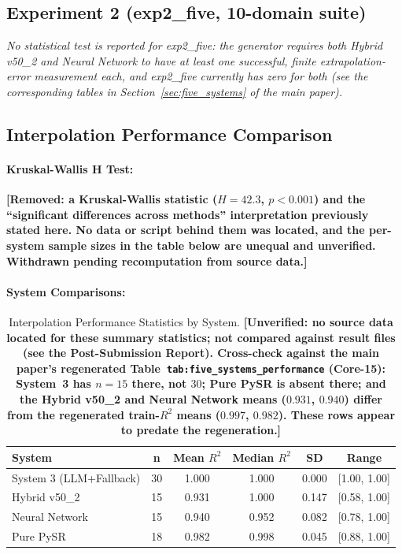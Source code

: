 \documentclass[twoside,11pt]{article}
\begin{document}

\subsection*{Experiment 2 (exp2\_five, 10-domain suite)}

\textit{No statistical test is reported for exp2\_five: the generator requires both Hybrid v50\_2 and Neural Network to have at least one successful, finite extrapolation-error measurement each, and exp2\_five currently has zero for both (see the corresponding tables in Section~\ref{sec:five_systems} of the main paper).}

\subsection{Interpolation Performance Comparison}

\paragraph{Kruskal-Wallis H Test:}
\textbf{[Removed: a Kruskal-Wallis statistic ($H = 42.3$, $p < 0.001$) and the
``significant differences across methods'' interpretation previously stated here.
No data or script behind them was located, and the per-system sample sizes in the
table below are unequal and unverified. Withdrawn pending recomputation from
source data.]}

\paragraph{System Comparisons:}
\begin{table}[H]
\centering
\caption{Interpolation Performance Statistics by System.
  \textbf{[Unverified: no source data located for these summary statistics; not
  compared against result files (see the Post-Submission Report). Cross-check against the
  main paper's regenerated Table~\texttt{tab:five\_systems\_performance} (Core-15): System~3 has
  $n=15$ there, not $30$; Pure PySR is absent there; and the Hybrid v50\_2 and Neural Network
  means ($0.931$, $0.940$) differ from the regenerated train-$R^2$ means ($0.997$, $0.982$).
  These rows appear to predate the regeneration.]}}
\label{tab:interpolation_stats}
\begin{tabular}{lccccc}
\toprule
\textbf{System} & \textbf{n} & \textbf{Mean $R^2$} & \textbf{Median $R^2$} & \textbf{SD} & \textbf{Range} \\
\midrule
System 3 (LLM+Fallback) & 30 & 1.000 & 1.000 & 0.000 & [1.00, 1.00] \\
Hybrid v50\_2 & 15 & 0.931 & 1.000 & 0.147 & [0.58, 1.00] \\
Neural Network & 15 & 0.940 & 0.952 & 0.082 & [0.78, 1.00] \\
Pure PySR & 18 & 0.982 & 0.998 & 0.045 & [0.88, 1.00] \\
\bottomrule
\end{tabular}
\end{table}
\end{document}
